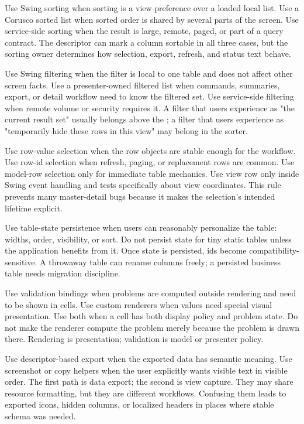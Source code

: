 Use Swing sorting when sorting is a view preference over a loaded local list.
Use a Corusco sorted list when sorted order is shared by several parts of the
screen. Use service-side sorting when the result is large, remote, paged, or
part of a query contract. The descriptor can mark a column sortable in all
three cases, but the sorting owner determines how selection, export, refresh,
and status text behave.

Use Swing filtering when the filter is local to one table and does not affect
other screen facts. Use a presenter-owned filtered list when commands,
summaries, export, or detail workflow need to know the filtered set. Use
service-side filtering when remote volume or security requires it. A filter
that users experience as "the current result set" usually belongs above the
; a filter that users experience as "temporarily hide these rows in
this view" may belong in the sorter.

Use row-value selection when the row objects are stable enough for the
workflow. Use row-id selection when refresh, paging, or replacement rows are
common. Use model-row selection only for immediate table mechanics. Use view
row only inside Swing event handling and tests specifically about view
coordinates. This rule prevents many master-detail bugs because it makes the
selection's intended lifetime explicit.

Use table-state persistence when users can reasonably personalize the table:
widths, order, visibility, or sort. Do not persist state for tiny static
tables unless the application benefits from it. Once state is persisted, ids
become compatibility-sensitive. A throwaway table can rename columns freely; a
persisted business table needs migration discipline.

Use validation bindings when problems are computed outside rendering and need
to be shown in cells. Use custom renderers when values need special visual
presentation. Use both when a cell has both display policy and problem state.
Do not make the renderer compute the problem merely because the problem is
drawn there. Rendering is presentation; validation is model or presenter
policy.

Use descriptor-based export when the exported data has semantic meaning. Use
screenshot or copy helpers when the user explicitly wants visible text in
visible order. The first path is data export; the second is view capture. They
may share resource formatting, but they are different workflows. Confusing
them leads to exported icons, hidden columns, or localized headers in places
where stable schema was needed.

